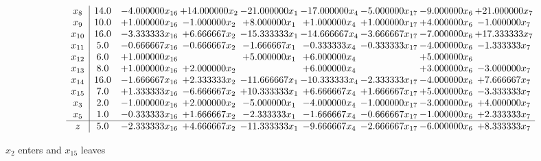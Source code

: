 \documentclass[10pt]{article}
\begin{document}
 \[\begin{array}{c| c c@{\hskip 2pt} c@{\hskip 2pt} c@{\hskip 2pt} c@{\hskip 2pt} c@{\hskip 2pt} c@{\hskip 2pt} c@{\hskip 2pt} }
 x_{8}   &  14.0 & -4.000000 x_{16} & + 14.000000 x_{2} & -21.000000 x_{1} & -17.000000 x_{4} & -5.000000 x_{17} & -9.000000 x_{6} & + 21.000000 x_{7}\\
 x_{9}   &  10.0 & + 1.000000 x_{16} & -1.000000 x_{2} & + 8.000000 x_{1} & + 1.000000 x_{4} & + 1.000000 x_{17} & + 4.000000 x_{6} & -1.000000 x_{7}\\
 x_{10}   &  16.0 & -3.333333 x_{16} & + 6.666667 x_{2} & -15.333333 x_{1} & -14.666667 x_{4} & -3.666667 x_{17} & -7.000000 x_{6} & + 17.333333 x_{7}\\
 x_{11}   &  5.0 & -0.666667 x_{16} & -0.666667 x_{2} & -1.666667 x_{1} & -0.333333 x_{4} & -0.333333 x_{17} & -4.000000 x_{6} & -1.333333 x_{7}\\
 x_{12}   &  6.0 & + 1.000000 x_{16} &   & + 5.000000 x_{1} & + 6.000000 x_{4} &   & + 5.000000 x_{6} &   \\
 x_{13}   &  8.0 & + 1.000000 x_{16} & + 2.000000 x_{2} &   & + 6.000000 x_{4} &   & + 3.000000 x_{6} & -3.000000 x_{7}\\
 x_{14}   &  16.0 & -1.666667 x_{16} & + 2.333333 x_{2} & -11.666667 x_{1} & -10.333333 x_{4} & -2.333333 x_{17} & -4.000000 x_{6} & + 7.666667 x_{7}\\
 x_{15}   &  7.0 & + 1.333333 x_{16} & -6.666667 x_{2} & + 10.333333 x_{1} & + 6.666667 x_{4} & + 1.666667 x_{17} & + 5.000000 x_{6} & -3.333333 x_{7}\\
 x_{3}   &  2.0 & -1.000000 x_{16} & + 2.000000 x_{2} & -5.000000 x_{1} & -4.000000 x_{4} & -1.000000 x_{17} & -3.000000 x_{6} & + 4.000000 x_{7}\\
 x_{5}   &  1.0 & -0.333333 x_{16} & + 1.666667 x_{2} & -2.333333 x_{1} & -1.666667 x_{4} & -0.666667 x_{17} & -1.000000 x_{6} & + 2.333333 x_{7}\\
\hline
z    &  5.0 & -2.333333 x_{16} & + 4.666667 x_{2} & -11.333333 x_{1} & -9.666667 x_{4} & -2.666667 x_{17} & -6.000000 x_{6} & + 8.333333 x_{7}\\
\end{array}\]


 $ x_{2} $ enters and $ x_{15} $ leaves 
\end{document}
